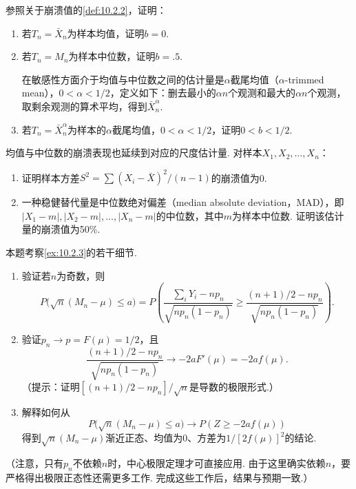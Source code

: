\begin{exercise}\label{exercise:10.20}
参照关于崩溃值的\autoref{def:10.2.2}，证明：
\begin{enumerate}[label=(\alph*)]
\item 若$T_n=\bar X_n$为样本均值，证明$b=0$.
\item 若$T_n=M_n$为样本中位数，证明$b=.5$.

在敏感性方面介于均值与中位数之间的估计量是$\alpha$截尾均值（$\alpha$-trimmed mean），$0<\alpha<1/2$，定义如下：删去最小的$\alpha n$个观测和最大的$\alpha n$个观测，取剩余观测的算术平均，得到$\bar X_n^\alpha$.
\item 若$T_n=\bar X_n^\alpha$为样本的$\alpha$截尾均值，$0<\alpha<1/2$，证明$0<b<1/2$.
\end{enumerate}
\end{exercise}

\begin{exercise}\label{exercise:10.21}
均值与中位数的崩溃表现也延续到对应的尺度估计量. 对样本$X_1,\allowbreak X_2,\allowbreak\ldots,\allowbreak X_n$：
\begin{enumerate}[label=(\alph*)]
\item 证明样本方差$S^2=\sum(X_i-\bar X)^2/(n-1)$的崩溃值为0.
\item 一种稳健替代量是中位数绝对偏差（median absolute deviation，MAD），即$|X_1-m|,|X_2-m|,\ldots,|X_n-m|$的中位数，其中$m$为样本中位数. 证明该估计量的崩溃值为50\%.
\end{enumerate}
\end{exercise}

\begin{exercise}\label{exercise:10.22}
本题考察\autoref{ex:10.2.3}的若干细节.
\begin{enumerate}[label=(\alph*)]
\item 验证若$n$为奇数，则
$$P\bigl(\sqrt n(M_n-\mu)\leq a\bigr)=P\left(\frac{\sum_iY_i-np_n}{\sqrt{np_n(1-p_n)}}\geq\frac{(n+1)/2-np_n}{\sqrt{np_n(1-p_n)}}\right).$$
\item 验证$p_n\to p=F(\mu)=1/2$，且
$$\frac{(n+1)/2-np_n}{\sqrt{np_n(1-p_n)}}\longrightarrow-2aF'(\mu)=-2af(\mu).$$
（提示：证明$[(n+1)/2-np_n]/\sqrt n$是导数的极限形式.）
\item 解释如何从
$$P\bigl(\sqrt n(M_n-\mu)\leq a\bigr)\longrightarrow P(Z\geq-2af(\mu))$$
得到$\sqrt n(M_n-\mu)$渐近正态、均值为0、方差为$1/[2f(\mu)]^2$的结论.
\end{enumerate}
（注意，只有$p_n$不依赖$n$时，中心极限定理才可直接应用. 由于这里确实依赖$n$，要严格得出极限正态性还需更多工作. 完成这些工作后，结果与预期一致.）
\end{exercise}

